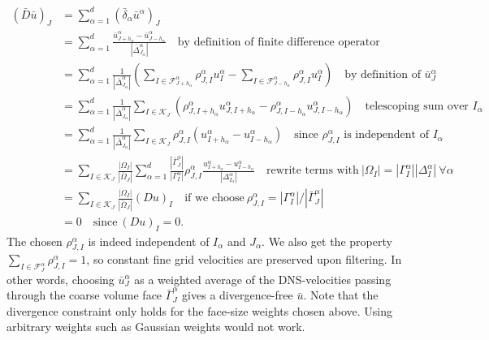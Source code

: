 \documentclass[preprint]{elsarticle}
\newcommand{\revboth}[1]{#1}
\begin{document}
\begin{equation} \label{eq:divfreefilter}
    \begin{split}
        (\bar{D} \bar{u})_J
        & = \sum_{\alpha = 1}^d (\bar{\delta}_\alpha \bar{u}^\alpha)_J \\
        & = \sum_{\alpha = 1}^d \frac{\bar{u}^\alpha_{J + h_\alpha} - \bar{u}^\alpha_{J -
        h_\alpha}}{| \bar{\Delta}^\alpha_{J_\alpha} |}
        \quad \revboth{\text{by definition of finite difference operator}} \\
        & = \sum_{\alpha = 1}^d 
        \frac{1}{| \bar{\Delta}^\alpha_{J_\alpha} |}
        \left(
            \sum_{I \in \mathcal{F}^\alpha_{J + h_\alpha}}
            \rho^\alpha_{J, I}
            u^\alpha_I
            - \sum_{I \in \mathcal{F}^\alpha_{J - h_\alpha}}
            \rho^\alpha_{J, I}
            u^\alpha_I
        \right)
        \quad \text{by definition of $\bar{u}^\alpha_J$} \\
        & =
        \sum_{\alpha = 1}^d 
        \frac{1}{| \bar{\Delta}^\alpha_{J_\alpha} |}
        \sum_{I \in \mathcal{K}_J}
        \left(
            \rho^\alpha_{J, I + h_\alpha} u^\alpha_{J, I + h_\alpha}
            - \rho^\alpha_{J, I - h_\alpha} u^\alpha_{J, I - h_\alpha}
        \right)
        \quad \text{telescoping sum over $I_\alpha$} \\
        & =
        \sum_{\alpha = 1}^d 
        \frac{1}{| \bar{\Delta}^\alpha_{J_\alpha} |}
        \sum_{I \in \mathcal{K}_J}
        \rho^\alpha_{J, I} 
        \left( u^\alpha_{I + h_\alpha} - u^\alpha_{I - h_\alpha} \right)
        \quad \text{since $\rho^\alpha_{J, I}$ is independent of $I_\alpha$} \\
        & =
        \sum_{I \in \mathcal{K}_J}
        \frac{| \Omega_I |}{| \bar{\Omega}_J |}
        \sum_{\alpha = 1}^d 
        \frac{| \bar{\Gamma}^\alpha_J |}{| \Gamma^\alpha_{I} |}
        \rho^\alpha_{J, I}
        \frac{u^\alpha_{I + h_\alpha} - u^\alpha_{I - h_\alpha}}{| \Delta^\alpha_{I_\alpha} |}
        \quad \text{rewrite terms with} \ | \Omega_I | = | \Gamma^\alpha_I | | \Delta^\alpha_I | 
        \ \forall \alpha \\
        & = 
        \sum_{I \in \mathcal{K}_J}
        \frac{| \Omega_I |}{| \bar{\Omega}_J |}
        (D u)_I
        \quad \text{if we choose} 
        \ \rho^\alpha_{J, I} =  | \Gamma^\alpha_{I} | / | \bar{\Gamma}^\alpha_{J} | \\
        & = 0
        \quad \revboth{\text{since} \ (D u)_I = 0.}
    \end{split}
\end{equation}
The chosen $\rho^\alpha_{J, I}$ is indeed independent of $I_\alpha$ and
$J_\alpha$. We also get the property $\sum_{I \in \mathcal{F}^\alpha_J}
\rho^\alpha_{J, I} = 1$, so constant fine grid velocities are preserved upon
filtering. In other words, choosing $\bar{u}^\alpha_J$ as a weighted average of
the DNS-velocities passing through the coarse volume face
$\bar{\Gamma}^\alpha_J$ gives a divergence-free $\bar{u}$. Note that the
divergence constraint only holds for the face-size weights chosen above. Using
arbitrary weights such as Gaussian weights would not work.
\end{document}

